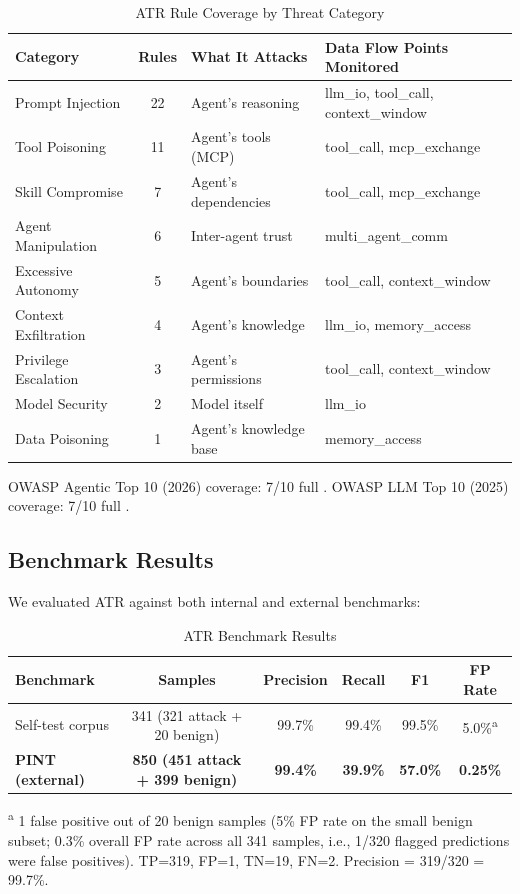 \documentclass[11pt,letterpaper]{article}
\begin{document}
\begin{table}[htbp]
\centering
\caption{ATR Rule Coverage by Threat Category}
\label{tab:coverage}
\footnotesize
\begin{tabularx}{\textwidth}{lclX}
\toprule
\textbf{Category} & \textbf{Rules} & \textbf{What It Attacks} & \textbf{Data Flow Points Monitored} \\
\midrule
Prompt Injection & 22 & Agent's reasoning & llm\_io, tool\_call, context\_window \\
Tool Poisoning & 11 & Agent's tools (MCP) & tool\_call, mcp\_exchange \\
Skill Compromise & 7 & Agent's dependencies & tool\_call, mcp\_exchange \\
Agent Manipulation & 6 & Inter-agent trust & multi\_agent\_comm \\
Excessive Autonomy & 5 & Agent's boundaries & tool\_call, context\_window \\
Context Exfiltration & 4 & Agent's knowledge & llm\_io, memory\_access \\
Privilege Escalation & 3 & Agent's permissions & tool\_call, context\_window \\
Model Security & 2 & Model itself & llm\_io \\
Data Poisoning & 1 & Agent's knowledge base & memory\_access \\
\bottomrule
\end{tabularx}
\end{table}

OWASP Agentic Top 10 (2026) coverage: 7/10 full \cite{owaspagentic}. OWASP LLM Top 10 (2025) coverage: 7/10 full \cite{owaspllm}.


\subsection{Benchmark Results}

We evaluated ATR against both internal and external benchmarks:

\begin{table}[htbp]
\centering
\caption{ATR Benchmark Results}
\label{tab:benchresults}
\begin{tabular}{lccccc}
\toprule
\textbf{Benchmark} & \textbf{Samples} & \textbf{Precision} & \textbf{Recall} & \textbf{F1} & \textbf{FP Rate} \\
\midrule
Self-test corpus & 341 (321 attack + 20 benign) & 99.7\% & 99.4\% & 99.5\% & 5.0\%\textsuperscript{a} \\
\textbf{PINT (external)} & \textbf{850 (451 attack + 399 benign)} & \textbf{99.4\%} & \textbf{39.9\%} & \textbf{57.0\%} & \textbf{0.25\%} \\
\bottomrule
\end{tabular}
\medskip

\footnotesize{\textsuperscript{a} 1 false positive out of 20 benign samples (5\% FP rate on the small benign subset; 0.3\% overall FP rate across all 341 samples, i.e., 1/320 flagged predictions were false positives). TP=319, FP=1, TN=19, FN=2. Precision = 319/320 = 99.7\%.}
\end{table}
\end{document}
